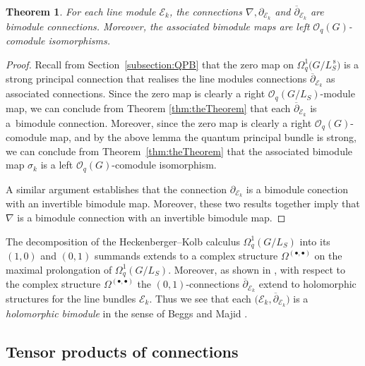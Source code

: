 \documentclass[pdftex]{sigma}
\numberwithin{equation}{section}
\newtheorem{Theorem}{Theorem}[section]
\newcommand\del{\partial}
\newcommand\adel{\overline{\partial}}
\begin{document}
\begin{Theorem}For each line module $\mathcal{E}_k$, the connections $\nabla, \partial_{\mathcal{E}_k}$ and $\overline{\partial}_{\mathcal{E}_k}$ are bimodule connections. Moreover, the associated bimodule maps are left $\mathcal{O}_q(G)$-comodule isomorphisms.
\end{Theorem}
\begin{proof}Recall from Section~\ref{subsection:QPB} that the zero map on $\Omega^1_q\big(G/L^{\,\mathrm{s}}_S\big)$ is a strong principal connection that realises the line modules connections $\adel_{\mathcal{E}_k}$ as associated connections. Since the zero map is clearly a right $\mathcal{O}_q(G/L_S)$-module map, we can conclude from Theorem \ref{thm:theTheorem} that each $\adel_{\mathcal{E}_k}$ is a~bimodule connection. Moreover, since the zero map is clearly a right $\mathcal{O}_q(G)$-comodule map, and by the above lemma the quantum principal bundle is strong, we can conclude from Theorem~\ref{thm:theTheorem} that the associated bimodule map $\sigma_k$ is a left $\mathcal{O}_q(G)$-comodule isomorphism.

A similar argument establishes that the connection $\del_{\mathcal{E}_k}$ is a bimodule conection with an invertible bimodule map. Moreover, these two results together imply that $\nabla$ is a bimodule connection with an invertible bimodule map.
\end{proof}

\begin{Remark}The decomposition of the Heckenberger--Kolb calculus $\Omega^1_q(G/L_S)$ into its $(1,0)$ and $(0,1)$ summands extends to a complex structure $\Omega^{(\bullet,\bullet)}$ on the maximal prolongation of $\Omega^1_q(G/L_S)$. Moreover, as shown in \cite[Theorem~4.5]{HVBQFM}, with respect to the complex structure $\Omega^{(\bullet,\bullet)}$ the $(0,1)$-connections $\adel_{\mathcal{E}_k}$ extend to holomorphic structures for the line bundles $\mathcal{E}_k$. Thus we see that each $\big(\mathcal{E}_k,\adel_{\mathcal{E}_k}\big)$ is a \emph{holomorphic bimodule} in the sense of Beggs and Majid \cite[Definition~7.14]{BeggsMajid:Leabh}.
\end{Remark}

\subsection{Tensor products of connections} \label{subsection:tensorprods}
\end{document}

